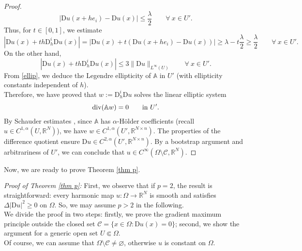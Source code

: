 \documentclass[a4paper,11pt]{article}
\numberwithin{equation}{section}
\newcommand{\numberset}{\mathbb}
\newcommand{\Om}{\Omega}
\newcommand{\R}{\numberset{R}}
\newcommand{\rom}{\mathrm}
\theoremstyle{definition}
\begin{document}
\begin{proof}
$$
|\rom Du(x+he_i)-\rom Du(x)|\leq\frac{\lambda}{2}\qquad\forall\  x\in U'.
$$
Thus, for $t\in[0,1]$, we estimate
$$
\left|\rom Du(x)+th\rom D_h^i\rom Du(x)\right|=\left|\rom Du(x)+t\left(\rom Du(x+he_i)-\rom Du(x)\right)\right|\geq\lambda-t\frac{\lambda}2\geq\frac{\lambda}2\qquad\forall\  x\in U'.
$$
On the other hand, 
$$
\left|\rom Du(x)+th\rom D_h^i\rom Du(x)\right|\leq 3\|\rom Du\|_{L^\infty(U)}\qquad\forall\  x\in U'.
$$
From \eqref{ellip}, we deduce the Legendre ellipticity of $\mathbb A$ in $U'$ (with ellipticity constants independent of $h$).\\
Therefore, we have proved that $w:=\rom D_h^i \rom Du$ solves the linear elliptic system
$$
{\rm div}(\mathbb Aw)=0\qquad\mbox{in } U'.
$$
By Schauder estimates \cite[Thm. 5.19]{GM}, since $\mathbb A$ has $\alpha$-H\"older coefficients (recall $u\in C^{1,\alpha}(U,\R^N)$), we have $w\in C^{1,\alpha}(U', \R^{N\times n})$. The properties of the difference quotient ensure $\rom D u\in C^{2,\alpha}(U',\R^{N\times n})$. By a bootstrap argument and arbitrariness of $U'$, we can conclude that $u\in C^\infty(\Om\setminus\mathscr C, \R^N)$.
\end{proof}

Now, we are ready to prove Theorem \ref{thm p}.

\medskip

\noindent \textit{Proof of Theorem \ref{thm p}:} First, we observe that if $p=2$, the result is straightforward: every harmonic map $u:\Om\longrightarrow \R^N$ is smooth and satisfies $\Delta|\rom Du|^2\geq0$ on $\Om$.
So, we may assume $p>2$ in the following. \\
We divide the proof in two steps: firstly, we prove the gradient maximum principle outside the closed set $\mathscr{C}=\{x\in\Om:\mathrm Du(x)=0\}$; second, we show the argument for a generic open set $U\Subset\Om$.\\
Of course, we can assume that $\Om\setminus\mathscr C\neq \varnothing$, otherwise $u$ is constant on $\Om$.

\medskip
\end{document}
